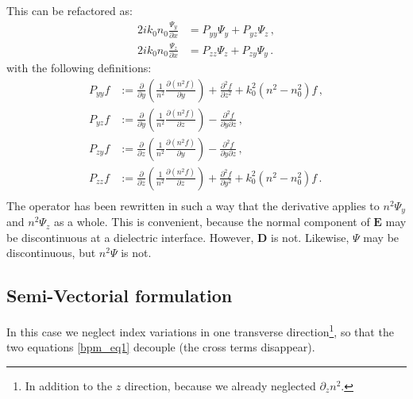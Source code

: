 \documentclass[]{article}
\begin{document}
	This can be refactored as:
	\begin{subequations}
		\begin{align}
			2i k_0 n_0 \frac{\Psi_y}{\partial x} &= P_{yy} \Psi_y+P_{yz} \Psi_z \, ,\\
			2i k_0 n_0 \frac{\Psi_z}{\partial x} &= P_{zz} \Psi_z+P_{zy} \Psi_y \, .
		\end{align}
		\label{bpm_eq1}
	\end{subequations}
	with the following definitions:
	\begin{subequations}
		\begin{align}
			P_{yy} f &:= \frac{\partial}{\partial y}\left(\frac{1}{n^2}\frac{\partial (n^2 f)}{\partial y}  \right)+\frac{\partial^2 f}{\partial z^2}+k_0^2(n^2-n_0^2)f\, , \\
			P_{yz} f &:= \frac{\partial}{\partial y}\left(\frac{1}{n^2}\frac{\partial (n^2 f)}{\partial z}  \right) - \frac{\partial^2 f}{\partial y \partial z}\, ,\\
			P_{zy} f &:= \frac{\partial}{\partial z}\left(\frac{1}{n^2}\frac{\partial (n^2 f)}{\partial y}  \right) - \frac{\partial^2 f}{\partial y \partial z}\, ,\\
			P_{zz} f &:= \frac{\partial}{\partial z}\left(\frac{1}{n^2}\frac{\partial (n^2 f)}{\partial z}  \right)+\frac{\partial^2 f}{\partial y^2}+k_0^2(n^2-n_0^2)f\, .\\
		\end{align}
	\end{subequations}
	The operator has been rewritten in such a way that the derivative applies to $n^2 \Psi_y$ and $n^2 \Psi_z$ as a whole. This is convenient, because the normal component of $\textbf{E}$ may be discontinuous at a dielectric interface. However, $\textbf{D}$ is not. Likewise, $\Psi$ may be discontinuous, but $n^2 \Psi$ is not.
	
	\subsection{Semi-Vectorial formulation}
	In this case we neglect index variations in one transverse direction\footnote{In addition to the $z$ direction, because we already neglected $\partial_z n^2$.}, so that the two equations \eqref{bpm_eq1} decouple (the cross terms disappear). 
		
\end{document}
